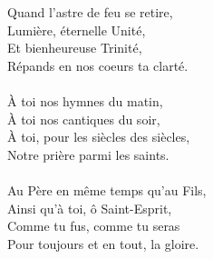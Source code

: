 Quand l’astre de feu se retire,\\
Lumière, éternelle Unité,\\
Et bienheureuse Trinité,\\
Répands en nos coeurs ta clarté.\\
\\
À toi nos hymnes du matin,\\
À toi nos cantiques du soir,\\
À toi, pour les siècles des siècles,\\
Notre prière parmi les saints.\\
\\
Au Père en même temps qu'au Fils,\\
Ainsi qu'à toi, ô Saint-Esprit,\\
Comme tu fus, comme tu seras\\
Pour toujours et en tout, la gloire.